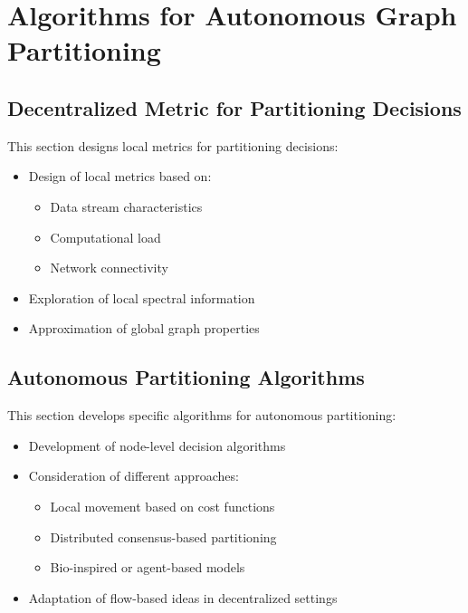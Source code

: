 \chapter{Algorithms for Autonomous Graph Partitioning}

\section{Decentralized Metric for Partitioning Decisions}
This section designs local metrics for partitioning decisions:
\begin{itemize}
    \item Design of local metrics based on:
        \begin{itemize}
            \item Data stream characteristics
            \item Computational load
            \item Network connectivity
        \end{itemize}
    \item Exploration of local spectral information
    \item Approximation of global graph properties
\end{itemize}

\section{Autonomous Partitioning Algorithms}
This section develops specific algorithms for autonomous partitioning:
\begin{itemize}
    \item Development of node-level decision algorithms
    \item Consideration of different approaches:
        \begin{itemize}
            \item Local movement based on cost functions
            \item Distributed consensus-based partitioning
            \item Bio-inspired or agent-based models
        \end{itemize}
    \item Adaptation of flow-based ideas in decentralized settings
\end{itemize}

